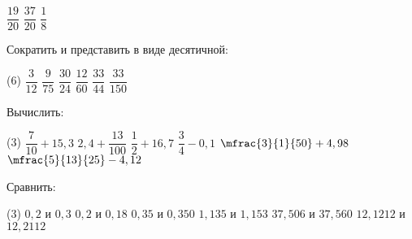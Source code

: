 \begin{class}[number=5-6]
\begin{listofex}
\begin{tasks}
			\task \( \dfrac{19}{20} \)
			\task \( \dfrac{37}{20} \)
			\task \( \dfrac{1}{8} \)
		\end{tasks}
		\item Сократить и представить в виде десятичной:
		\begin{tasks}(6)
			\task \( \dfrac{3}{12} \)
			\task \( \dfrac{9}{75} \)
			\task \( \dfrac{30}{24} \)
			\task \( \dfrac{12}{60} \)
			\task \( \dfrac{33}{44} \)
			\task \( \dfrac{33}{150} \)
		\end{tasks}
		\item Вычислить:
		\begin{tasks}(3)
			\task \( \dfrac{7}{10}+15,3 \)
			\task \( 2,4+\dfrac{13}{100} \)
			\task \( \dfrac{1}{2}+16,7 \)
			\task \( \dfrac{3}{4}-0,1 \)
			\task \( \mfrac{3}{1}{50}+4,98 \)
			\task \( \mfrac{5}{13}{25}-4,12 \)
		\end{tasks}
		\item Сравнить:
		\begin{tasks}(3)
			\task \( 0,2 \) и \( 0,3 \)
			\task \( 0,2 \) и \( 0,18 \)
			\task \( 0,35 \) и \( 0,350 \)
			\task \( 1,135 \) и \( 1,153 \)
			\task \( 37,506 \) и \( 37,560 \)
			\task \( 12,1212 \) и \( 12,2112 \)
		\end{tasks}
	\end{listofex}
\end{class}
%
%
%
%
%
%	
%
%
%	
%
%
%	
